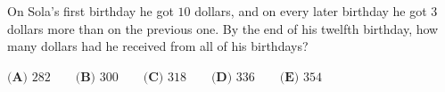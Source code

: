On Sola's first birthday he got $10$ dollars, and on every later birthday he got $3$ dollars more than on the previous one. By the end of his twelfth birthday, how many dollars had he received from all of his birthdays?

$\textbf{(A) }282\qquad\textbf{(B) }300\qquad\textbf{(C) }318\qquad\textbf{(D) }336\qquad\textbf{(E) }354$
